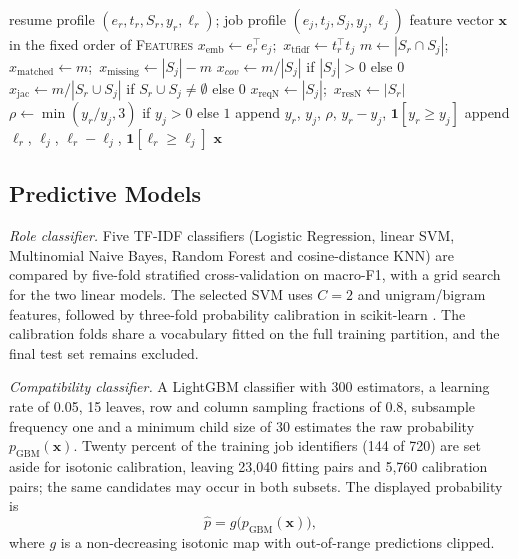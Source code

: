 \documentclass[conference]{IEEEtran}
\begin{document}
\begin{algorithm}[!tb]
\caption{Pair feature construction ($\mathbf{x}\in\mathbb{R}^{17}$)}
\small
\begin{algorithmic}[1]
\Require resume profile $(e_r,t_r,S_r,y_r,\ell_r)$; job profile $(e_j,t_j,S_j,y_j,\ell_j)$
\Ensure feature vector $\mathbf{x}$ in the fixed order of \textsc{Features}
\State $x_{\mathrm{emb}}\leftarrow e_r^{\top}e_j$;\ $x_{\mathrm{tfidf}}\leftarrow t_r^{\top}t_j$
\State $m\leftarrow |S_r\cap S_j|$;\ $x_{\mathrm{matched}}\leftarrow m$;\ $x_{\mathrm{missing}}\leftarrow |S_j|-m$
\State $x_{cov}\leftarrow m/|S_j|$ if $|S_j|>0$ else $0$
\State $x_{\mathrm{jac}}\leftarrow m/|S_r\cup S_j|$ if $S_r\cup S_j\neq\emptyset$ else $0$
\State $x_{\mathrm{reqN}}\leftarrow |S_j|$;\ $x_{\mathrm{resN}}\leftarrow |S_r|$
\State $\rho\leftarrow \min(y_r/y_j,3)$ if $y_j>0$ else $1$
\State append $y_r$, $y_j$, $\rho$, $y_r-y_j$, $\mathbf{1}[y_r\ge y_j]$
\State append $\ell_r$, $\ell_j$, $\ell_r-\ell_j$, $\mathbf{1}[\ell_r\ge\ell_j]$
\State \Return $\mathbf{x}$
\end{algorithmic}
\end{algorithm}

\subsection{Predictive Models}
\textit{Role classifier.} Five TF-IDF classifiers (Logistic Regression, linear SVM, Multinomial Naive Bayes, Random Forest and cosine-distance KNN) are compared by five-fold stratified cross-validation on macro-F1, with a grid search for the two linear models. The selected SVM uses $C=2$ and unigram/bigram features, followed by three-fold probability calibration in scikit-learn \cite{b16}. The calibration folds share a vocabulary fitted on the full training partition, and the final test set remains excluded.

\textit{Compatibility classifier.} A LightGBM classifier with 300 estimators, a learning rate of 0.05, 15 leaves, row and column sampling fractions of 0.8, subsample frequency one and a minimum child size of 30 estimates the raw probability $p_{\mathrm{GBM}}(\mathbf{x})$. Twenty percent of the training job identifiers (144 of 720) are set aside for isotonic calibration, leaving 23,040 fitting pairs and 5,760 calibration pairs; the same candidates may occur in both subsets. The displayed probability is
\begin{equation}
\hat{p}=g\big(p_{\mathrm{GBM}}(\mathbf{x})\big),
\end{equation}
where $g$ is a non-decreasing isotonic map with out-of-range predictions clipped.
\end{document}
